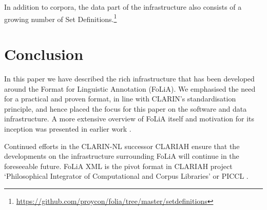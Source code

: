 \documentclass[a4paper,11pt]{article}
\begin{document}
In addition to corpora, the data part of the infrastructure also consists of a
growing number of Set
Definitions.\footnote{\url{https://github.com/proycon/folia/tree/master/setdefinitions}}

\section{Conclusion}
\label{sec:conclusion}

In this paper we have described the rich infrastructure that has been developed around
the Format for Linguistic Annotation (FoLiA). We emphasised the need for a
practical and proven format, in line with CLARIN's standardisation principle,
and hence placed the focus for this paper on the software and data
infrastructure. A more extensive overview of FoLiA itself and motivation for its
inception was presented in earlier work \cite{FOLIACLIN2013}.

Continued efforts in the CLARIN-NL successor CLARIAH ensure that the
developments on the infrastructure surrounding FoLiA will continue in the
foreseeable future. FoLiA XML is the pivot format in CLARIAH project
`Philosophical Integrator of Computational and Corpus Libraries' or PICCL
\cite{Reynaert2015}.



%
  
\end{document}
